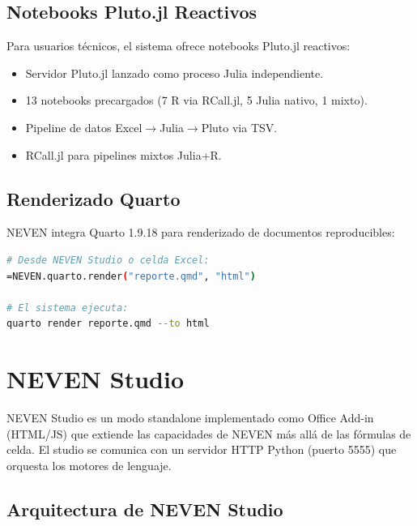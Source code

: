 \documentclass[12pt, a4paper]{report}
\begin{document}
\section{Notebooks Pluto.jl Reactivos}

Para usuarios técnicos, el sistema ofrece notebooks Pluto.jl reactivos:

\begin{itemize}
    \item Servidor Pluto.jl lanzado como proceso Julia independiente.
    \item 13 notebooks precargados (7 R via RCall.jl, 5 Julia nativo, 1 mixto).
    \item Pipeline de datos Excel$\rightarrow$Julia$\rightarrow$Pluto via TSV.
    \item RCall.jl para pipelines mixtos Julia+R.
\end{itemize}

\section{Renderizado Quarto}

NEVEN integra Quarto 1.9.18 para renderizado de documentos reproducibles:

\begin{lstlisting}[language=bash, caption={Integración Quarto via CreateProcess}]
# Desde NEVEN Studio o celda Excel:
=NEVEN.quarto.render("reporte.qmd", "html")

# El sistema ejecuta:
quarto render reporte.qmd --to html
\end{lstlisting}

\chapter{NEVEN Studio}

NEVEN Studio es un modo standalone implementado como Office Add-in (HTML/JS) que extiende las capacidades de NEVEN más allá de las fórmulas de celda. El studio se comunica con un servidor HTTP Python (puerto 5555) que orquesta los motores de lenguaje.

\section{Arquitectura de NEVEN Studio}
\end{document}
